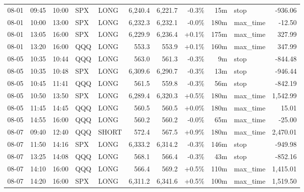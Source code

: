 \documentclass[11pt,a4paper,twoside]{article}
\begin{document}
\begin{center}
\begin{longtable}{>{\color{txtmain}}l l l l l r r r r >{\color{txtmain}}l r}
08-01 & 09:45 & 10:00 & SPX & LONG & 6,240.4 & 6,221.7 & \textcolor{lossred}{-0.3\%} & 15m & stop & \textcolor{lossred}{-936.06} \\
08-01 & 10:00 & 13:00 & SPX & LONG & 6,232.3 & 6,232.1 & \textcolor{lossred}{-0.0\%} & 180m & max\_time & \textcolor{lossred}{-12.50} \\
08-01 & 13:05 & 16:00 & SPX & LONG & 6,229.9 & 6,236.4 & \textcolor{wingreen}{+0.1\%} & 175m & max\_time & \textcolor{wingreen}{327.99} \\
08-01 & 13:20 & 16:00 & QQQ & LONG & 553.3 & 553.9 & \textcolor{wingreen}{+0.1\%} & 160m & max\_time & \textcolor{wingreen}{347.99} \\
08-05 & 10:35 & 10:44 & QQQ & LONG & 563.0 & 561.3 & \textcolor{lossred}{-0.3\%} & 9m & stop & \textcolor{lossred}{-844.48} \\
08-05 & 10:35 & 10:48 & SPX & LONG & 6,309.6 & 6,290.7 & \textcolor{lossred}{-0.3\%} & 13m & stop & \textcolor{lossred}{-946.44} \\
08-05 & 10:45 & 11:41 & QQQ & LONG & 561.5 & 559.8 & \textcolor{lossred}{-0.3\%} & 56m & stop & \textcolor{lossred}{-842.19} \\
08-05 & 10:50 & 13:50 & SPX & LONG & 6,289.4 & 6,320.3 & \textcolor{wingreen}{+0.5\%} & 180m & max\_time & \textcolor{wingreen}{1,542.99} \\
08-05 & 11:45 & 14:45 & QQQ & LONG & 560.5 & 560.5 & \textcolor{wingreen}{+0.0\%} & 180m & max\_time & \textcolor{wingreen}{15.01} \\
08-05 & 14:55 & 16:00 & QQQ & LONG & 560.2 & 560.2 & \textcolor{lossred}{-0.0\%} & 65m & max\_time & \textcolor{lossred}{-25.00} \\
08-07 & 09:40 & 12:40 & QQQ & SHORT & 572.4 & 567.5 & \textcolor{wingreen}{+0.9\%} & 180m & max\_time & \textcolor{wingreen}{2,470.01} \\
08-07 & 11:50 & 14:16 & SPX & LONG & 6,333.2 & 6,314.2 & \textcolor{lossred}{-0.3\%} & 146m & stop & \textcolor{lossred}{-949.98} \\
08-07 & 13:25 & 14:08 & QQQ & LONG & 568.1 & 566.4 & \textcolor{lossred}{-0.3\%} & 43m & stop & \textcolor{lossred}{-852.16} \\
08-07 & 14:10 & 16:00 & QQQ & LONG & 566.4 & 569.2 & \textcolor{wingreen}{+0.5\%} & 110m & max\_time & \textcolor{wingreen}{1,415.01} \\
08-07 & 14:20 & 16:00 & SPX & LONG & 6,311.2 & 6,341.6 & \textcolor{wingreen}{+0.5\%} & 100m & max\_time & \textcolor{wingreen}{1,519.50} \\

\end{longtable}
\end{center}
\end{document}
